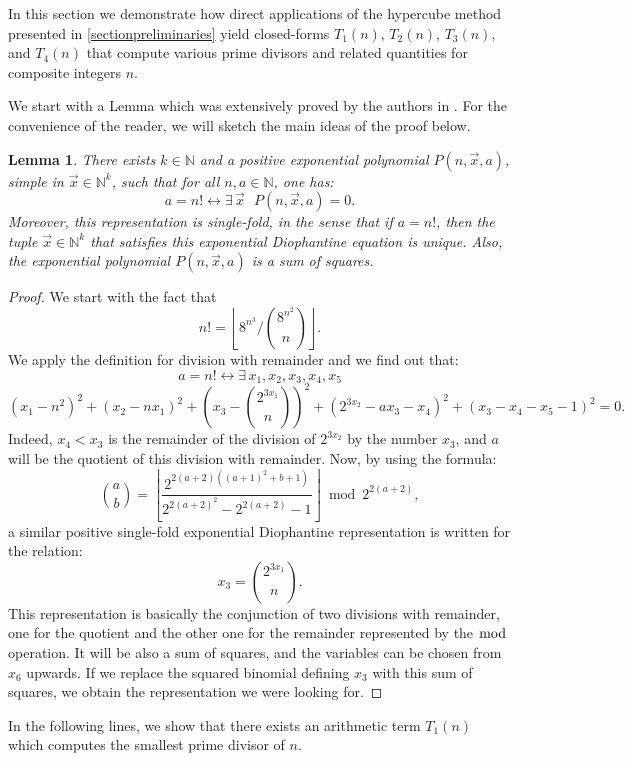 \documentclass[10pt]{article}
\theoremstyle{plain}
\newtheorem{lemma}{Lemma}[section]
\newcommand{\floor}[1]{\left\lfloor #1 \right\rfloor}
\begin{document}
In this section we demonstrate how direct applications of the hypercube method presented in \cref{sectionpreliminaries} yield closed-forms $T_1(n)$, $T_2(n)$, $T_3(n)$, and $T_4(n)$ that compute various prime divisors and related quantities for composite integers $n$.

We start with a Lemma which was extensively proved by the authors in \cite{prunescushunia2024primes}. For the convenience of the reader, we will sketch the main ideas of the proof below.

\begin{lemma}\label{lemmafactorialsinglefold}
    There exists $k \in \mathbb N$ and a positive exponential polynomial $P(n, \vec x, a)$, simple in $\vec x \in \mathbb N^k$, such that for all $n, a \in \mathbb N$, one has:
    $$a = n! \longleftrightarrow \exists\,\vec x\,\,\,\, P(n, \vec x, a) =0. $$
    Moreover, this representation is single-fold, in the sense that if $a = n!$, then the tuple $\vec x \in \mathbb N^k$ that satisfies this exponential Diophantine equation is unique. Also, the exponential polynomial $P(n, \vec x, a)$ is a sum of squares.
\end{lemma}

\begin{proof}
    We start with the fact that
    $$n! = \floor{ 8^{n^3} \Big/ \binom{8^{n^2}}{n} } .$$
    We apply the definition for division with remainder and we find out that:
    $$a = n! \longleftrightarrow \exists\,x_1, x_2, x_3, x_4, x_5
    $$ $$ (x_1 - n^2)^2 + (x_2 - nx_1)^2 + \left(x_3 - \binom{2^{3x_1}}{n} \right)^2 +
    (2^{3x_2} - ax_3 -x_4)^2 + (x_3 - x_4 - x_5 - 1)^2 = 0.$$
    Indeed, $x_4 < x_3$ is the remainder of the division of $2^{3x_2}$ by the number $x_3$, and $a$ will be the quotient of this division with remainder. Now, by using the formula:
    $$\binom{a}{b} = \floor{\frac{2^{2(a+2)((a+1)^2+b+1)}}{2^{2(a+2)^2} - 2^{2(a+2)} - 1}} \bmod 2^{2(a+2)}, $$
    a similar positive single-fold exponential Diophantine representation is written for the relation:
    $$x_3 = \binom{2^{3x_1}}{n}.$$
    This representation is basically the conjunction of two divisions with remainder, one for the quotient and the other one for the remainder represented by the $\bmod$ operation. It will be also a sum of squares, and the variables can be chosen from $x_6$ upwards. If we replace the squared binomial defining $x_3$ with this sum of squares, we obtain the representation we were looking for.
\end{proof}

In the following lines, we show that there exists an arithmetic term $T_1(n)$ which computes the smallest prime divisor of $n$.
\end{document}
